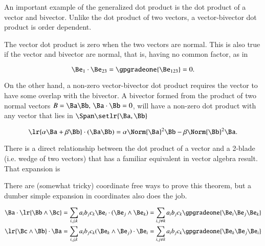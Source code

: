 An important example of the generalized dot product is the dot product of a vector and bivector.
Unlike the dot product of two vectors, a vector-bivector dot product is order dependent.

The vector dot product is zero when the two vectors are normal.  This is also true if the vector and bivector are normal, that is, having no common factor, as in

\begin{equation}\label{eqn:generalizedDot:661}
\Be_1 \cdot \Be_{23} = \gpgradeone{ \Be_{123} } = 0.
\end{equation}

On the other hand, a non-zero vector-bivector dot product requires the vector to have some overlap with the bivector.
A bivector formed from the product of two normal vectors \( B = \Ba \Bb, \, \Ba \cdot \Bb = 0 \), will have a non-zero dot product with any vector that lies in \( \Span \setlr{ \Ba, \Bb} \)

\begin{dmath}\label{eqn:generalizedDot:681}
\lr{ \alpha \Ba + \beta \Bb } \cdot (\Ba\Bb)
=
\alpha \Norm{\Ba}^2 \Bb - \beta \Norm{\Bb}^2 \Ba.
\end{dmath}

There is a direct relationship between the
dot product of a vector and a 2-blade (i.e. wedge of two vectors) that has a familiar equivalent in  vector algebra result.  That expansion is


There are (somewhat tricky) coordinate free ways to prove this theorem, but a dumber simple expansion in coordinates also does the job.

\begin{dmath}\label{eqn:gradeselectionProblems:681}
\begin{aligned}
\Ba \cdot \lr{ \Bb \wedge \Bc } &= \sum_{i, j, k} a_i b_j c_k \Be_i \cdot (\Be_j \wedge \Be_k)
= \sum_{i, j \ne k} a_i b_j c_k \gpgradeone{ \Be_i \Be_j \Be_k }
\\
\lr{ \Bc \wedge \Bb } \cdot \Ba &= \sum_{i, j, k} a_i b_j c_k (\Be_k \wedge \Be_j) \cdot \Be_i
= \sum_{i, j \ne k} a_i b_j c_k \gpgradeone{ \Be_k \Be_j \Be_i }
\end{aligned}
\end{dmath}

